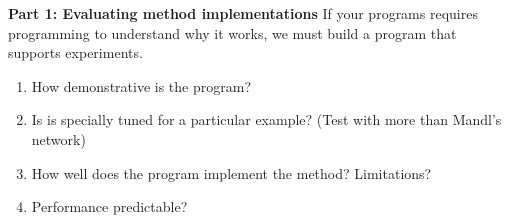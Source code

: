 



\textbf{Part 1: Evaluating method implementations}
If your programs requires programming to understand why it works, we must build a program that supports experiments.
\begin{enumerate}
\item How demonstrative is the program?
\item Is is specially tuned for a particular example? (Test with more than Mandl's network)
\item How well does the program implement the method? Limitations? 
\item Performance predictable?
\end{enumerate}


